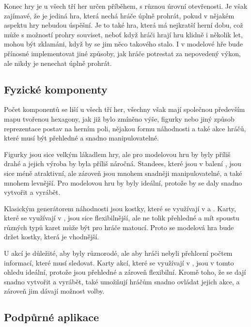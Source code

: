 Konec hry je u všech tří her určen příběhem, s různou úrovní otevřenosti. Je však zajímavé, že  je jediná hra, která nechá hráče úplně prohrát, pokud v nějakém aspektu hry nebudou úspěšní. Je to také hra, která má nejkratší herní dobu, což může s možností prohry souviset, neboť když hráči hrají hru klidně i několik let, mohou být zklamáni, když by se jim něco takového stalo. I v modelové hře bude přínosné implementovat jiné způsoby, jak hráče potrestat za nepovedený výkon, ale nikdy je nenechat úplně prohrát.

\subsection{Fyzické komponenty}
\label{subsec:comparison_components}

Počet komponentů se liší u všech tří her, všechny však mají společnou především mapu tvořenou hexagony, jak již bylo zmíněno výše, figurky nebo jiný způsob reprezentace postav na herním poli, nějakou formu náhodnosti a také akce hráčů, které musí být přehledné a snadno manipulovatelné.

Figurky  jsou sice velkým lákadlem hry, ale pro modelovou hru by byly příliš drahé a jejich výroba by byla příliš náročná. Standees, které jsou v balení , jsou sice méně atraktivní, ale zároveň jsou mnohem snadněji manipulovatelné, a také mnohem levnější. Pro modelovou hru by byly ideální, protože by se daly snadno vytvořit a vyrábět.

Klasickým generátorem náhodnosti jsou kostky, které se využívají v \dnd{} a . Karty, které se využívají v , jsou sice flexibilnější, ale ne tolik přehledné a mít spoustu různých typů karet může být pro hráče matoucí. Proto se modelová hra bude držet kostky, která je vhodnější.

U akcí je důležité, aby byly různorodé, ale aby hráči nebyli přehlcení počtem informací, které musí sledovat. Karty akcí, které se využívají v , jsou v tomto ohledu ideální, protože jsou přehledné a zároveň flexibilní. Kromě toho, že se dají snadno vytvořit a vyrábět, také umožňují hráčům snadno ovládat jejich akce, a zároveň jim dávají možnost volby.

\subsection{Podpůrné aplikace}
\label{subsec:comparison_apps}

